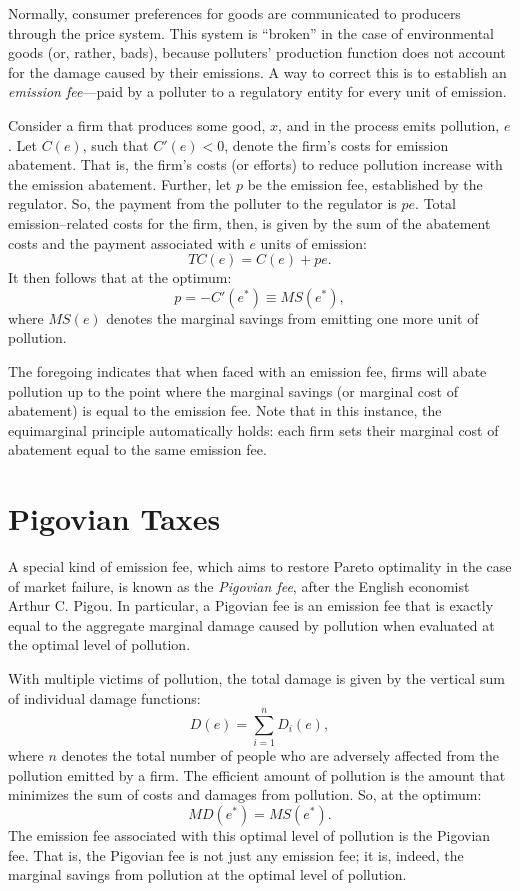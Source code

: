 \documentclass[
]{book}
\begin{document}
Normally, consumer preferences for goods are communicated to producers through the price system. This system is ``broken'' in the case of environmental goods (or, rather, bads), because polluters' production function does not account for the damage caused by their emissions. A way to correct this is to establish an \emph{emission fee}---paid by a polluter to a regulatory entity for every unit of emission.

Consider a firm that produces some good, \(x\), and in the process emits pollution, \(e\). Let \(C(e)\), such that \(C'(e)<0\), denote the firm's costs for emission abatement. That is, the firm's costs (or efforts) to reduce pollution increase with the emission abatement. Further, let \(p\) be the emission fee, established by the regulator. So, the payment from the polluter to the regulator is \(pe\). Total emission--related costs for the firm, then, is given by the sum of the abatement costs and the payment associated with \(e\) units of emission: \[TC(e) = C(e)+pe.\] It then follows that at the optimum: \[p=-C'(e^*) \equiv MS(e^*),\] where \(MS(e)\) denotes the marginal savings from emitting one more unit of pollution.

The foregoing indicates that when faced with an emission fee, firms will abate pollution up to the point where the marginal savings (or marginal cost of abatement) is equal to the emission fee. Note that in this instance, the equimarginal principle automatically holds: each firm sets their marginal cost of abatement equal to the same emission fee.

\hypertarget{pigovian-taxes}{%
\section{Pigovian Taxes}\label{pigovian-taxes}}

A special kind of emission fee, which aims to restore Pareto optimality in the case of market failure, is known as the \emph{Pigovian fee}, after the English economist Arthur C. Pigou. In particular, a Pigovian fee is an emission fee that is exactly equal to the aggregate marginal damage caused by pollution when evaluated at the optimal level of pollution.

With multiple victims of pollution, the total damage is given by the vertical sum of individual damage functions: \[D(e) = \sum_{i=1}^{n}D_i(e),\] where \(n\) denotes the total number of people who are adversely affected from the pollution emitted by a firm. The efficient amount of pollution is the amount that minimizes the sum of costs and damages from pollution. So, at the optimum: \[MD(e^*) = MS(e^*).\] The emission fee associated with this optimal level of pollution is the Pigovian fee. That is, the Pigovian fee is not just any emission fee; it is, indeed, the marginal savings from pollution at the optimal level of pollution.
\end{document}
